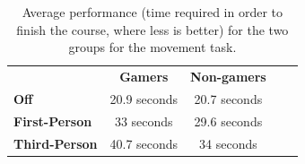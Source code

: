 \documentclass[runningheads,a4paper,oribibl]{llncs}
\begin{document}





\begin{table}[]
\centering
\setlength{\tabcolsep}{1em}
\def\arraystretch{1.8}
\begin{tabular}{l|c|cll}
                      & {\textbf{Gamers}} & {\textbf{Non-gamers}} &  &  \\ \cline{1-3}
\textbf{Off}          & 20.9 seconds                                    & 20.7 seconds                                          &  &  \\ \cline{1-3}
\textbf{First-Person} & 33 seconds                                   & 29.6 seconds                                        &  &  \\ \cline{1-3}
\textbf{Third-Person} & 40.7 seconds                                    & 34 seconds                                        &  & 
\end{tabular}
\caption{Average performance (time required in order to finish the course, where less is better) for the two groups for the movement task.}
\label{tab:Task3GraphP}
\end{table}



\end{document}
